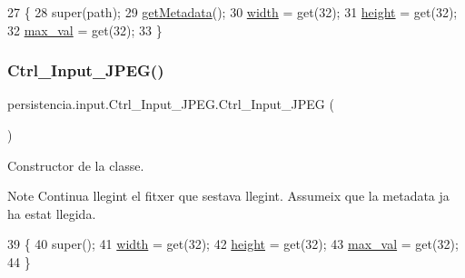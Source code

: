 \begin{DoxyCode}
27                                         \{
28         super(path);
29         \hyperlink{classpersistencia_1_1input_1_1Ctrl__Input_a46e05fce164a6803820c02565c1769c8}{getMetadata}();
30         \hyperlink{classpersistencia_1_1input_1_1Ctrl__Input__JPEG_a07d902b25b54941dc0444398c7d380e7}{width} = \textcolor{keyword}{get}(32);
31         \hyperlink{classpersistencia_1_1input_1_1Ctrl__Input__JPEG_a9e6805b998e58981f8cd7b8b6e609f27}{height} = \textcolor{keyword}{get}(32);
32         \hyperlink{classpersistencia_1_1input_1_1Ctrl__Input__JPEG_a8720235be6a11ef90085217064bbb1b0}{max\_val} = \textcolor{keyword}{get}(32);
33     \}
\end{DoxyCode}
\mbox{\label{classpersistencia_1_1input_1_1Ctrl__Input__JPEG_a5c340483ee0fc78f985bd5d2ddcbb3a0}} 
\subsubsection{\texorpdfstring{Ctrl\+\_\+\+Input\+\_\+\+J\+P\+E\+G()}{Ctrl\_Input\_JPEG()}\hspace{0.1cm}{\footnotesize\ttfamily [2/2]}}
{\footnotesize\ttfamily persistencia.\+input.\+Ctrl\+\_\+\+Input\+\_\+\+J\+P\+E\+G.\+Ctrl\+\_\+\+Input\+\_\+\+J\+P\+EG (\begin{DoxyParamCaption}{ }\end{DoxyParamCaption})\hspace{0.3cm}{\ttfamily [inline]}}



Constructor de la classe. 

\begin{DoxyNote}{Note}
Continua llegint el fitxer que s\textquotesingle{}estava llegint. Assumeix que la metadata ja ha estat llegida. 
\end{DoxyNote}

\begin{DoxyCode}
39                              \{
40         super();
41         \hyperlink{classpersistencia_1_1input_1_1Ctrl__Input__JPEG_a07d902b25b54941dc0444398c7d380e7}{width} = \textcolor{keyword}{get}(32);
42         \hyperlink{classpersistencia_1_1input_1_1Ctrl__Input__JPEG_a9e6805b998e58981f8cd7b8b6e609f27}{height} = \textcolor{keyword}{get}(32);
43         \hyperlink{classpersistencia_1_1input_1_1Ctrl__Input__JPEG_a8720235be6a11ef90085217064bbb1b0}{max\_val} = \textcolor{keyword}{get}(32);
44     \}
\end{DoxyCode}


